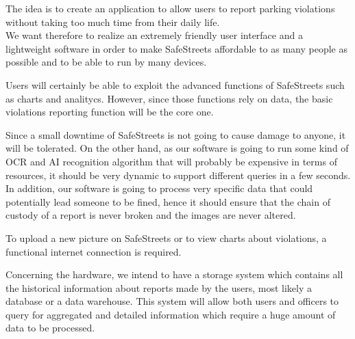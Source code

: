\setlength{\parskip}{1em}
The idea is to create an application to allow users to report parking violations without taking too much time from their daily life.
\\We want therefore to realize an extremely friendly user interface and a lightweight software in order to make SafeStreets affordable to as many people as possible and to be able to run by many devices.

Users will certainly be able to exploit the advanced functions of SafeStreets such as charts and analitycs. However, since those functions rely on data, the basic violations reporting function will be the core one.

Since a small downtime of SafeStreets is not going to cause damage to anyone, it will be tolerated. On the other hand, as our software is going to run some kind of OCR and AI recognition algorithm that will probably be expensive in terms of resources, it should be very dynamic to support different queries in a few seconds.
\\In addition, our software is going to process very specific data that could potentially lead someone to be fined, hence it should ensure that the chain of custody of a report is never broken and the images are never altered.

To upload a new picture on SafeStreets or to view charts about violations, a functional internet connection is required.

Concerning the hardware, we intend to have a storage system which contains all the historical information about reports made by the users, most likely a database or a data warehouse. This system will allow both users and officers to query for aggregated and detailed information which require a huge amount of data to be processed.